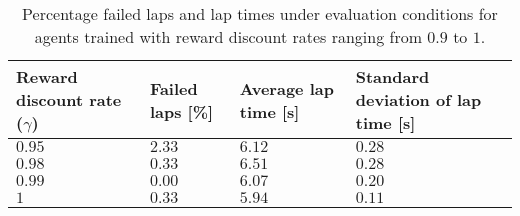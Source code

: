 \begin{table}[htb!]
\centering
\small
\begin{tabularx}{0.8\textwidth}{RLLL} 
    \hline
    \textbf{Reward discount rate ($\gamma$)} & \textbf{Failed laps [\%]} & \textbf{Average lap time [s]} & \textbf{Standard deviation of lap time [s]}\\ 
    \hline
    $0.95$  & $2.33$    & $6.12$  & $0.28$ \\      
    $0.98$  & $0.33$    & $6.51$  & $0.28$ \\
    $0.99$  & $0.00$    & $6.07$  & $0.20$ \\
    $1$     & $0.33$    & $5.94$  & $0.11$ \\
    \hline
\end{tabularx}
\caption[Evaluation results of end-to-end agents with various reward discount rates]{Percentage failed laps and lap times under evaluation conditions for agents trained with reward discount rates ranging from $0.9$ to $1$.}
\label{tab:gamma}
\end{table}
